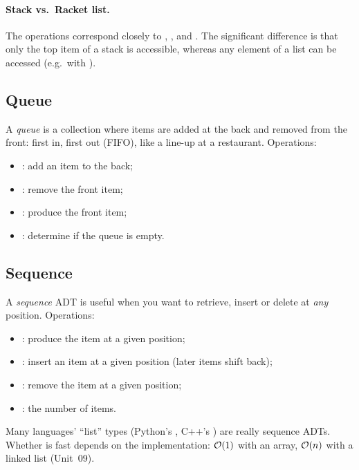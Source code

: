 \paragraph{Stack vs.\ Racket list.} The operations correspond closely to ,
,  and . The significant difference is that only the top
item of a stack is accessible, whereas any element of a list can be accessed (e.g.\ with
).

\subsection{Queue}

A \emph{queue} is a collection where items are added at the back and removed from the front:
first in, first out (FIFO), like a line-up at a restaurant. Operations:
\begin{itemize}
  \item {}: add an item to the back;
  \item {}: remove the front item;
  \item {}: produce the front item;
  \item {}: determine if the queue is empty.
\end{itemize}

\subsection{Sequence}

A \emph{sequence} ADT is useful when you want to retrieve, insert or delete at \emph{any}
position. Operations:
\begin{itemize}
  \item {}: produce the item at a given position;
  \item {}: insert an item at a given position (later items shift back);
  \item {}: remove the item at a given position;
  \item {}: the number of items.
\end{itemize}

\begin{aside}
Many languages' ``list'' types (Python's , C++'s ) are really
sequence ADTs. Whether  is fast depends on the implementation: $\mathcal{O}(1)$ with
an array, $\mathcal{O}(n)$ with a linked list (Unit~09).
\end{aside}

